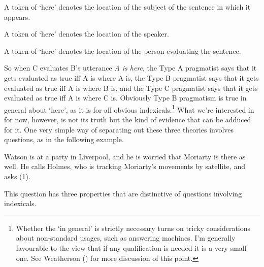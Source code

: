 \documentclass[
  11pt,
  letterpaper,
  DIV=11,
  numbers=noendperiod,
  twoside]{scrartcl}
\providecommand{\tightlist}{%
  \setlength{\itemsep}{0pt}\setlength{\parskip}{0pt}}
\begin{document}
\begin{description}
\tightlist
\item[Type A pragmatism]
A token of `here' denotes the location of the subject of the sentence in
which it appears.
\item[Type B pragmatism]
A token of `here' denotes the location of the speaker.
\item[Type C pragmatism]
A token of `here' denotes the location of the person evaluating the
sentence.
\end{description}

So when C evaluates B's utterance \emph{A is here}, the Type A
pragmatist says that it gets evaluated as true iff A is where A is, the
Type B pragmatist says that it gets evaluated as true iff A is where B
is, and the Type C pragmatist says that it gets evaluated as true iff A
is where C is. Obviously Type B pragmatism is true in general about
`here', as it is for all obvious indexicals.\footnote{Whether the `in
  general' is strictly necessary turns on tricky considerations about
  non-standard usages, such as answering machines. I'm generally
  favourable to the view that if any qualification is needed it is a
  very small one. See Weatherson
  () for more discussion of
  this point.} What we're interested in for now, however, is not its
truth but the kind of evidence that can be adduced for it. One very
simple way of separating out these three theories involves questions, as
in the following example.

Watson is at a party in Liverpool, and he is worried that Moriarty is
there as well. He calls Holmes, who is tracking Moriarty's movements by
satellite, and asks (1).

This question has three properties that are distinctive of questions
involving indexicals.
\end{document}

